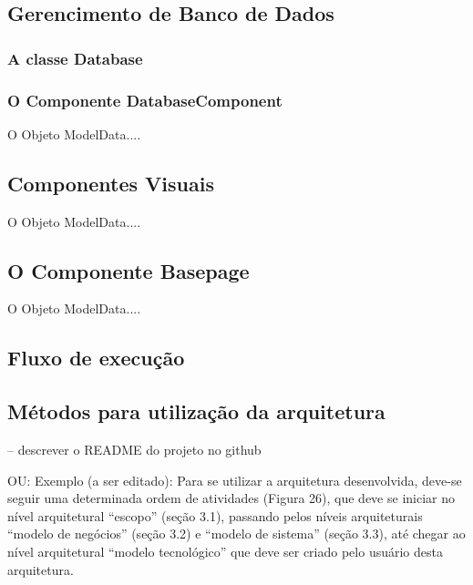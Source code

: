 \subsection{Gerencimento de Banco de Dados}\label{sec:solucao-desenvolvida}
\subsubsection{A classe Database}\label{sec:solucao-desenvolvida}
\subsubsection{O Componente DatabaseComponent}\label{sec:solucao-desenvolvida}
O Objeto ModelData....


\subsection{Componentes Visuais}\label{sec:solucao-desenvolvida}
O Objeto ModelData....


\subsection{O Componente Basepage}\label{sec:solucao-desenvolvida}
O Objeto ModelData....


\subsection{Fluxo de execução}\label{sec:solucao-desenvolvida}


\subsection{Métodos para utilização da arquitetura}
-- descrever o README do projeto no github

OU:
Exemplo (a ser editado): Para se utilizar a arquitetura desenvolvida, deve-se seguir uma determinada ordem de atividades (Figura 26), que deve se iniciar no nível arquitetural “escopo” (seção 3.1), passando pelos níveis arquiteturais “modelo de negócios” (seção 3.2) e “modelo de sistema” (seção 3.3), até chegar ao nível arquitetural “modelo tecnológico” que deve ser criado pelo usuário desta arquitetura.